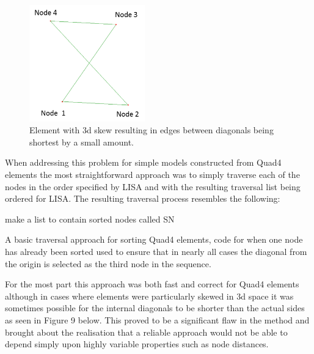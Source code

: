 \begin{figure}[!h]
  \centerline{\includegraphics[width=50mm , scale=1]{../Graphics/BadlyOrderedNodes.png}}
  \caption{Element with 3d skew resulting in edges between diagonals being shortest by a small amount.
  }
  \label{fig:h-refinementImp}
\end{figure}

\noindent
When addressing this problem for simple models constructed from Quad4 elements the most straightforward approach was to simply traverse each of the nodes in the order specified by LISA and with the resulting traversal list being ordered for LISA. The resulting traversal process resembles the following: \\
	


\begin{algorithm}[H]
 make a list to contain sorted nodes called SN
 \caption{A basic traversal approach for sorting Quad4 elements, code for when one node has already been sorted used to ensure that in nearly all cases the diagonal from the origin is selected as the third node in the sequence.}
\end{algorithm}

\noindent
For the most part this approach was both fast and correct for Quad4 elements although in cases where elements were particularly skewed in 3d space it was sometimes possible for the internal diagonals to be shorter than the actual sides as seen in Figure 9 below. This proved to be a significant flaw in the method and brought about the realisation that a reliable approach would not be able to depend simply upon highly variable properties such as node distances. \\ 

